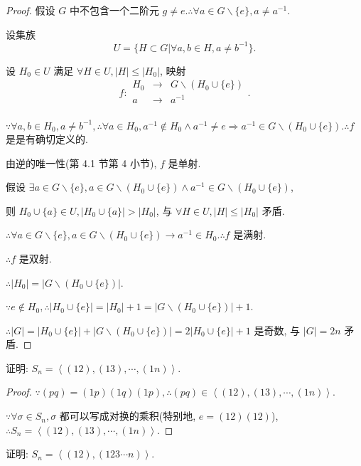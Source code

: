 \documentclass{ctexart}
\begin{document}
\begin{proof}
    假设 $G$ 中不包含一个二阶元 $g\neq e.\therefore\forall a\in G\backslash\{e\},a\neq a^{-1}$.

    设集族
    \[U=\{H\subset G|\forall a,b\in H,a\neq b^{-1}\}.\]

    设 $H_0\in U$ 满足 $\forall H\in U,|H|\leq|H_0|$, 映射
    \[f:\begin{array}{rcl}
        H_0 & \to & G\backslash(H_0\cup\{e\}) \\
        a & \to & a^{-1} \\
    \end{array}.\]

    $\because\forall a,b\in H_0,a\neq b^{-1},\therefore\forall a\in H_0,a^{-1}\notin H_0\land a^{-1}\neq e\Rightarrow a^{-1}\in G\backslash(H_0\cup\{e\}).\therefore f$ 是是有确切定义的.

    由逆的唯一性(第 4.1 节第 4 小节), $f$ 是单射.

    假设 $\exists a\in G\backslash\{e\},a\in G\backslash(H_0\cup\{e\})\land a^{-1}\in G\backslash(H_0\cup\{e\})$,

    则 $H_0\cup\{a\}\in U,|H_0\cup\{a\}|>|H_0|$, 与 $\forall H\in U,|H|\leq|H_0|$ 矛盾.

    $\therefore\forall a\in G\backslash\{e\},a\in G\backslash(H_0\cup\{e\})\to a^{-1}\in H_0.\therefore f$ 是满射.

    $\therefore f$ 是双射.

    $\therefore|H_0|=|G\backslash(H_0\cup\{e\})|$.

    $\because e\notin H_0,\therefore|H_0\cup\{e\}|=|H_0|+1=|G\backslash(H_0\cup\{e\})|+1$.

    $\therefore|G|=|H_0\cup\{e\}|+|G\backslash(H_0\cup\{e\})|=2|H_0\cup\{e\}|+1$ 是奇数, 与 $|G|=2n$ 矛盾.
\end{proof}
\begin{exercise}[2.9]\label{ex2.9}
    证明: $S_n=\left<(12),(13),\cdots,(1n)\right>$.
\end{exercise}
\begin{proof}
    $\because(pq)=(1p)(1q)(1p),\therefore(pq)\in\left<(12),(13),\cdots,(1n)\right>$.

    $\because\forall\sigma\in S_n,\sigma$ 都可以写成对换的乘积(特别地, $e=(12)(12)$), $\therefore S_n=\left<(12),(13),\cdots,(1n)\right>$.
\end{proof}
\begin{exercise}[2.10]\label{ex2.10}
    证明: $S_n=\left<(12),(123\cdots n)\right>$.
\end{exercise}
\end{document}
